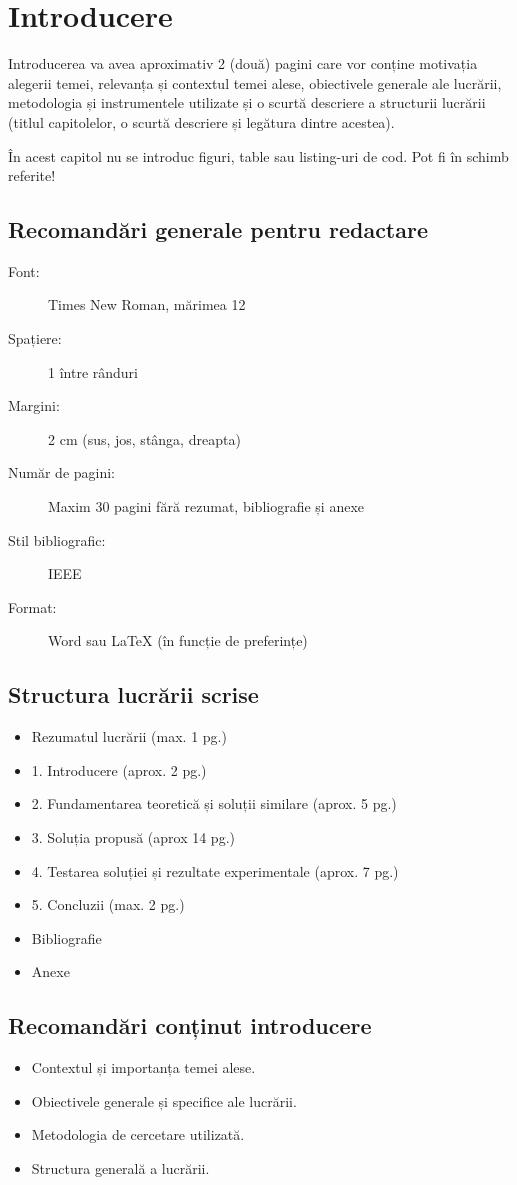 \chapter{Introducere}
\label{cap:cap1}

Introducerea va avea aproximativ 2 (două) pagini care vor conține motivația alegerii temei, relevanța și contextul temei alese, obiectivele generale ale lucrării, metodologia și instrumentele utilizate și o scurtă descriere a structurii lucrării (titlul capitolelor, o scurtă descriere și legătura dintre acestea).

În acest capitol nu se introduc figuri, table sau listing-uri de cod. Pot fi în schimb referite!


\section{Recomandări generale pentru redactare}

\begin{description}
    \item[Font:]  Times New Roman, mărimea 12
    \item[Spațiere:] 1 între rânduri
    \item[Margini:] 2 cm (sus, jos, stânga, dreapta)
    \item[Număr de pagini:] Maxim 30 pagini fără rezumat, bibliografie și anexe
    \item[Stil bibliografic:] IEEE
    \item[Format:] Word sau LaTeX (în funcție de preferințe)
\end{description}

\section{Structura lucrării scrise}

\begin{itemize}
    \item Rezumatul lucrării (max. 1 pg.)
    \item 1. Introducere (aprox. 2 pg.)
    \item 2. Fundamentarea teoretică și soluții similare (aprox. 5 pg.)
    \item 3. Soluția propusă (aprox 14 pg.)
    \item 4. Testarea soluției și rezultate experimentale (aprox. 7 pg.)
    \item 5. Concluzii (max. 2 pg.)
    \item Bibliografie
    \item Anexe
\end{itemize}

\section{Recomandări conținut introducere}

\begin{itemize}
    \item Contextul și importanța temei alese.
    \item Obiectivele generale și specifice ale lucrării.
    \item Metodologia de cercetare utilizată.
    \item Structura generală a lucrării.
\end{itemize}